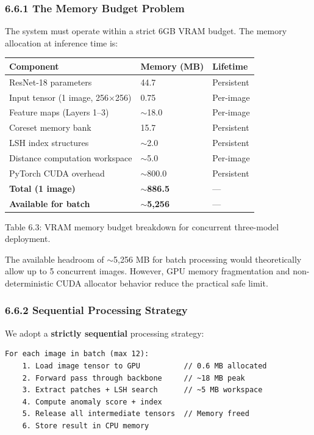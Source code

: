 \documentclass[12pt, a4paper, oneside]{report}
\begin{document}
\subsubsection{6.6.1 The Memory Budget Problem}\label{the-memory-budget-problem}

The system must operate within a strict 6GB VRAM budget. The memory allocation at inference time is:

{\def\LTcaptype{none} %
\begin{longtable}[]{@{}lll@{}}
\toprule\noalign{}
Component & Memory (MB) & Lifetime \\
\midrule\noalign{}
\endhead
\bottomrule\noalign{}
\endlastfoot
ResNet-18 parameters & 44.7 & Persistent \\
Input tensor (1 image, 256$\times$256) & 0.75 & Per-image \\
Feature maps (Layers 1--3) & ${\sim}$18.0 & Per-image \\
Coreset memory bank & 15.7 & Persistent \\
LSH index structures & ${\sim}$2.0 & Persistent \\
Distance computation workspace & ${\sim}$5.0 & Per-image \\
PyTorch CUDA overhead & ${\sim}$800.0 & Persistent \\
\textbf{Total (1 image)} & \textbf{${\sim}$886.5} & --- \\
\textbf{Available for batch} & \textbf{${\sim}$5,256} & --- \\
\end{longtable}
}

Table 6.3: VRAM memory budget breakdown for concurrent three-model deployment.

The available headroom of ${\sim}$5,256 MB for batch processing would theoretically allow up to 5 concurrent images. However, GPU memory fragmentation and non-deterministic CUDA allocator behavior reduce the practical safe limit.

\subsubsection{6.6.2 Sequential Processing Strategy}\label{sequential-processing-strategy}

We adopt a \textbf{strictly sequential} processing strategy:

\begin{lstlisting}
For each image in batch (max 12):
    1. Load image tensor to GPU          // 0.6 MB allocated
    2. Forward pass through backbone     // ~18 MB peak
    3. Extract patches + LSH search      // ~5 MB workspace
    4. Compute anomaly score + index
    5. Release all intermediate tensors  // Memory freed
    6. Store result in CPU memory
\end{lstlisting}
\end{document}
